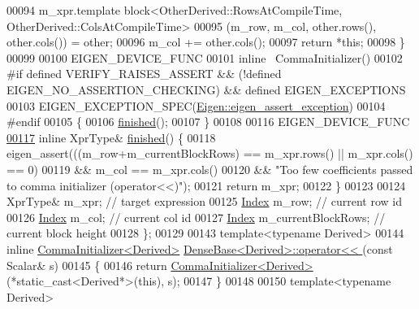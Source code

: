 \begin{DoxyCode}
00094     m\_xpr.template block<OtherDerived::RowsAtCompileTime, OtherDerived::ColsAtCompileTime>
00095                     (m\_row, m\_col, other.rows(), other.cols()) = other;
00096     m\_col += other.cols();
00097     \textcolor{keywordflow}{return} *\textcolor{keyword}{this};
00098   \}
00099 
00100   EIGEN\_DEVICE\_FUNC
00101   \textcolor{keyword}{inline} ~CommaInitializer()
00102 \textcolor{preprocessor}{#if defined VERIFY\_RAISES\_ASSERT && (!defined EIGEN\_NO\_ASSERTION\_CHECKING) && defined EIGEN\_EXCEPTIONS}
00103   EIGEN\_EXCEPTION\_SPEC(\hyperlink{struct_eigen_1_1eigen__assert__exception}{Eigen::eigen\_assert\_exception})
00104 \textcolor{preprocessor}{#endif}
00105   \{
00106       \hyperlink{group___core___module_a3be7de7fb3e8d3c4d3063f480181b17f}{finished}();
00107   \}
00108 
00116   EIGEN\_DEVICE\_FUNC
\hyperlink{group___core___module_a3be7de7fb3e8d3c4d3063f480181b17f}{00117}   \textcolor{keyword}{inline} XprType& \hyperlink{group___core___module_a3be7de7fb3e8d3c4d3063f480181b17f}{finished}() \{
00118       eigen\_assert(((m\_row+m\_currentBlockRows) == m\_xpr.rows() || m\_xpr.cols() == 0)
00119            && m\_col == m\_xpr.cols()
00120            && \textcolor{stringliteral}{"Too few coefficients passed to comma initializer (operator<<)"});
00121       \textcolor{keywordflow}{return} m\_xpr;
00122   \}
00123 
00124   XprType& m\_xpr;           \textcolor{comment}{// target expression}
00125   \hyperlink{namespace_eigen_a62e77e0933482dafde8fe197d9a2cfde}{Index} m\_row;              \textcolor{comment}{// current row id}
00126   \hyperlink{namespace_eigen_a62e77e0933482dafde8fe197d9a2cfde}{Index} m\_col;              \textcolor{comment}{// current col id}
00127   \hyperlink{namespace_eigen_a62e77e0933482dafde8fe197d9a2cfde}{Index} m\_currentBlockRows; \textcolor{comment}{// current block height}
00128 \};
00129 
00143 \textcolor{keyword}{template}<\textcolor{keyword}{typename} Derived>
00144 \textcolor{keyword}{inline} \hyperlink{group___core___module_struct_eigen_1_1_comma_initializer}{CommaInitializer<Derived>} 
      \hyperlink{group___core___module_a0e575eb0ba6cc6bc5f347872abd8509d}{DenseBase<Derived>::operator<< }(\textcolor{keyword}{const} Scalar& s)
00145 \{
00146   \textcolor{keywordflow}{return} \hyperlink{group___core___module_struct_eigen_1_1_comma_initializer}{CommaInitializer<Derived>}(*\textcolor{keyword}{static\_cast<}Derived*\textcolor{keyword}{>}(\textcolor{keyword}{this}), s);
00147 \}
00148 
00150 \textcolor{keyword}{template}<\textcolor{keyword}{typename} Derived>

\end{DoxyCode}
